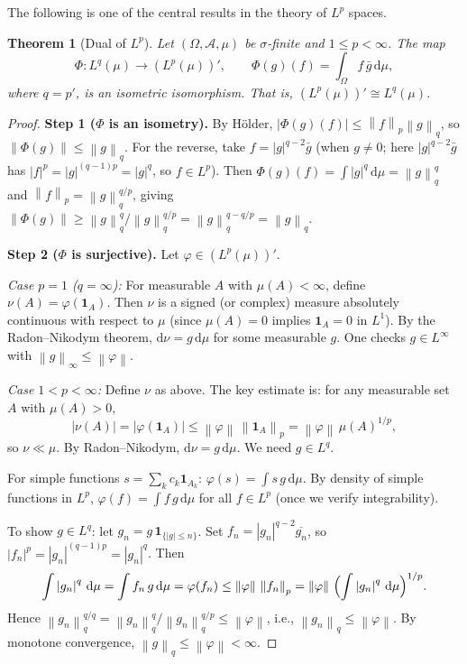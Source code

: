 \documentclass[a4paper,12pt]{book}
\newcommand{\dd}{\mathrm{d}}
\newcommand{\norm}[1]{\left\| #1 \right\|}
\newcommand{\abs}[1]{\left| #1 \right|}
\theoremstyle{definition}
\theoremstyle{plain}
\newtheorem{theorem}[definition]{Theorem}
\theoremstyle{remark}
\begin{document}
The following is one of the central results in the theory of $L^p$ spaces.

\begin{theorem}[Dual of $L^p$]\label{thm:Lp-dual}
Let $(\Omega, \mathcal{A}, \mu)$ be $\sigma$-finite and $1 \le p < \infty$. The
map
\[
  \Phi \colon L^q(\mu) \longrightarrow (L^p(\mu))', \qquad
  \Phi(g)(f) = \int_\Omega f\, \bar{g}\, \dd\mu,
\]
where $q = p'$, is an isometric isomorphism. That is,
$(L^p(\mu))' \cong L^q(\mu)$.
\end{theorem}

\begin{proof}
\textbf{Step 1 ($\Phi$ is an isometry).}
By H\"older, $\abs{\Phi(g)(f)} \le \norm{f}_p\norm{g}_q$, so
$\norm{\Phi(g)} \le \norm{g}_q$. For the reverse, take
$f = \abs{g}^{q-2}\bar{g}$ (when $g \ne 0$; here $\abs{g}^{q-2}\bar{g}$ has
$\abs{f}^p = \abs{g}^{(q-1)p} = \abs{g}^q$, so $f \in L^p$). Then
$\Phi(g)(f) = \int \abs{g}^q\, \dd\mu = \norm{g}_q^q$ and
$\norm{f}_p = \norm{g}_q^{q/p}$, giving
$\norm{\Phi(g)} \ge \norm{g}_q^q / \norm{g}_q^{q/p} = \norm{g}_q^{q - q/p} = \norm{g}_q$.

\textbf{Step 2 ($\Phi$ is surjective).} Let $\varphi \in (L^p(\mu))'$.

\emph{Case $p = 1$ ($q = \infty$):} For measurable $A$ with $\mu(A) < \infty$,
define $\nu(A) = \varphi(\mathbf{1}_A)$. Then $\nu$ is a signed (or complex) measure
absolutely continuous with respect to $\mu$ (since $\mu(A) = 0$ implies
$\mathbf{1}_A = 0$ in $L^1$). By the Radon--Nikodym theorem,
$\dd\nu = g\, \dd\mu$ for some measurable $g$. One checks $g \in L^\infty$ with
$\norm{g}_\infty \le \norm{\varphi}$.

\emph{Case $1 < p < \infty$:} Define $\nu$ as above. The key estimate is:
for any measurable set $A$ with $\mu(A) > 0$,
\[
  \abs{\nu(A)} = \abs{\varphi(\mathbf{1}_A)} \le \norm{\varphi}\, \norm{\mathbf{1}_A}_p
  = \norm{\varphi}\, \mu(A)^{1/p},
\]
so $\nu \ll \mu$. By Radon--Nikodym, $\dd\nu = g\, \dd\mu$. We need $g \in L^q$.

For simple functions $s = \sum_k c_k \mathbf{1}_{A_k}$:
$\varphi(s) = \int s\, g\, \dd\mu$. By density of simple functions in $L^p$,
$\varphi(f) = \int f\, g\, \dd\mu$ for all $f \in L^p$ (once we verify integrability).

To show $g \in L^q$: let $g_n = g\, \mathbf{1}_{\{\abs{g} \le n\}}$. Set
$f_n = \abs{g_n}^{q-2}\overline{g_n}$, so $\abs{f_n}^p = \abs{g_n}^{(q-1)p} = \abs{g_n}^q$.
Then
\[
  \int \abs{g_n}^q\, \dd\mu = \int f_n\, g\, \dd\mu = \varphi(f_n)
  \le \norm{\varphi}\, \norm{f_n}_p = \norm{\varphi}\, \Bigl(\int \abs{g_n}^q\, \dd\mu\Bigr)^{1/p}.
\]
Hence $\norm{g_n}_q^{q/q} = \norm{g_n}_q^q / \norm{g_n}_q^{q/p} \le \norm{\varphi}$,
i.e., $\norm{g_n}_q \le \norm{\varphi}$. By monotone convergence,
$\norm{g}_q \le \norm{\varphi} < \infty$.
\end{proof}
\end{document}
